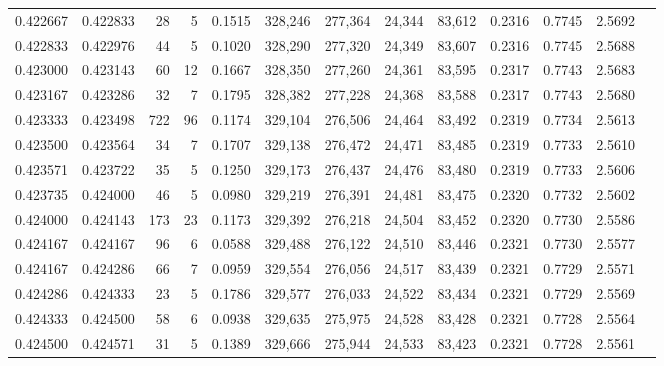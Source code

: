 \begin{tabular}{rrrrrrrrrrrrr}
0.422667 & 0.422833 &    28 &   5 &                                     0.1515 & 328,246 & 277,364 &  24,344 &  83,612 & 0.2316 & 0.7745 & 2.5692 \\
0.422833 & 0.422976 &    44 &   5 &                                     0.1020 & 328,290 & 277,320 &  24,349 &  83,607 & 0.2316 & 0.7745 & 2.5688 \\
0.423000 & 0.423143 &    60 &  12 &                                     0.1667 & 328,350 & 277,260 &  24,361 &  83,595 & 0.2317 & 0.7743 & 2.5683 \\
0.423167 & 0.423286 &    32 &   7 &                                     0.1795 & 328,382 & 277,228 &  24,368 &  83,588 & 0.2317 & 0.7743 & 2.5680 \\
0.423333 & 0.423498 &   722 &  96 &                                     0.1174 & 329,104 & 276,506 &  24,464 &  83,492 & 0.2319 & 0.7734 & 2.5613 \\
0.423500 & 0.423564 &    34 &   7 &                                     0.1707 & 329,138 & 276,472 &  24,471 &  83,485 & 0.2319 & 0.7733 & 2.5610 \\
0.423571 & 0.423722 &    35 &   5 &                                     0.1250 & 329,173 & 276,437 &  24,476 &  83,480 & 0.2319 & 0.7733 & 2.5606 \\
0.423735 & 0.424000 &    46 &   5 &                                     0.0980 & 329,219 & 276,391 &  24,481 &  83,475 & 0.2320 & 0.7732 & 2.5602 \\
0.424000 & 0.424143 &   173 &  23 &                                     0.1173 & 329,392 & 276,218 &  24,504 &  83,452 & 0.2320 & 0.7730 & 2.5586 \\
0.424167 & 0.424167 &    96 &   6 &                                     0.0588 & 329,488 & 276,122 &  24,510 &  83,446 & 0.2321 & 0.7730 & 2.5577 \\
0.424167 & 0.424286 &    66 &   7 &                                     0.0959 & 329,554 & 276,056 &  24,517 &  83,439 & 0.2321 & 0.7729 & 2.5571 \\
0.424286 & 0.424333 &    23 &   5 &                                     0.1786 & 329,577 & 276,033 &  24,522 &  83,434 & 0.2321 & 0.7729 & 2.5569 \\
0.424333 & 0.424500 &    58 &   6 &                                     0.0938 & 329,635 & 275,975 &  24,528 &  83,428 & 0.2321 & 0.7728 & 2.5564 \\
0.424500 & 0.424571 &    31 &   5 &                                     0.1389 & 329,666 & 275,944 &  24,533 &  83,423 & 0.2321 & 0.7728 & 2.5561 \\

\end{tabular}
